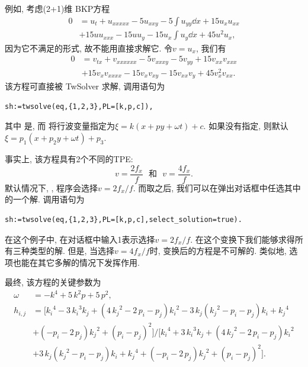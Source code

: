 例如, 考虑(2+1)维 BKP方程\CITEbaBKP
\begin{equation}
\begin{split}
0&=u_t+u_{xxxxx}-5u_{xxy}-5\int{u_{yy}\dd{x}}+15u_xu_{xx}\\
&+15uu_{xxx}-15uu_y-15u_x\int{u_y\dd{x}}+45u^2u_x, \label{BKP}
\end{split}
\end{equation}
因为它不满足的形式, 故不能用直接求解它. 令$v=u_x$, 我们有
\begin{equation}
\begin{split}
0&=v_{tx}+v_{xxxxxx}-5v_{xxxy}-5v_{yy}+15v_{xx}v_{xxx}\\
&+15v_xv_{xxxx}-15v_xv_{xy}-15v_{xx}v_y+45v_x^2v_{xx}. \label{BKP-T}
\end{split}
\end{equation}
该方程可直接被 TwSolver 求解, 调用语句为
\begin{verbatim}
sh:=twsolve(eq,{1,2,3},PL=[k,p,c]), 
\end{verbatim}
其中 是, 而 将行波变量指定为$\xi=k(x+py+\omega t)+c$. 如果没有指定, 则默认$\xi=p_1(x+p_2 y+\omega t)+p_3$. 

事实上, 该方程具有2个不同的TPE:
\begin{equation}
v=\frac{2f_x}{f}\text{~~和~~}v=\frac{4f_x}{f}.
\end{equation}
默认情况下, , 程序会选择$v=2f_x/f$. 而取之后, 我们可以在弹出对话框中任选其中的一个解. 调用语句为
\begin{verbatim}
sh:=twsolve(eq,{1,2,3},PL=[k,p,c],select_solution=true).
\end{verbatim}
在这个例子中, 在对话框中输入1表示选择$v=2f_x/f$. 在这个变换下我们能够求得所有三种类型的解. 但是, 当选择$v=4f_x/f$时, 变换后的方程是不可解的. 类似地, 选项也能在其它多解的情况下发挥作用.

最终, 该方程的关键参数为
\begin{equation}
\begin{split}
\omega&=-{k}^{4}+5\,{k}^{2}p+5\,{p}^{2}, \\ 
h_{i,j}&=[{k_{{i}}}^{4}-3\,{k_{{i}}}^{3}k_{{j}}+ \left( 4\,{k_{{j}}}^{2}-2\,p_{{i}}-p_{{j}} \right) {k_{{i}}}^{2}-3\,k_{{j}} \left( {k_{{j}}}^{2}-p_{{i}}-p_{{j}} \right) k_{{i}}+{k_{{j}}}^{4}\\
&+\left( -p_{{i}}-2\,p_{{j}}\right) {k_{{j}}}^{2}+ \left( p_{{i}}-p_{{j}} \right) ^{2}]/[{k_{{i}}}^{4}+3\,{k_{{i}}}^{3}k_{{j}}+ \left( 4\,{k_{{j}}}^{2}-2\,p_{{i}}-p_{{j}} \right) {k_{{i}}}^{2}\\
&+3\,k_{{j}} \left( {k_{{j}}}^{2}-p_{{i}}-p_{{j}} \right) k_{{i}}+{k_{{j}}}^{4}+ \left( -p_{{i}}-2\,p_{{j}}\right) {k_{{j}}}^{2}+ \left( p_{{i}}-p_{{j}} \right) ^{2}].
\end{split}
\end{equation}

